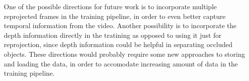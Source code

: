 One of the possible directions for future work is to incorporate multiple reprojected frames in the training pipeline, in order to even better capture temporal information from the video. Another possibility is to incorporate the depth information directly in the tratining as opposed to using it just for reprojection, since depth information could be helpful in separating occluded objects. These directions would probably require some new approaches to storing and loading the data, in order to accomodate increasing amount of data in the training pipeline.